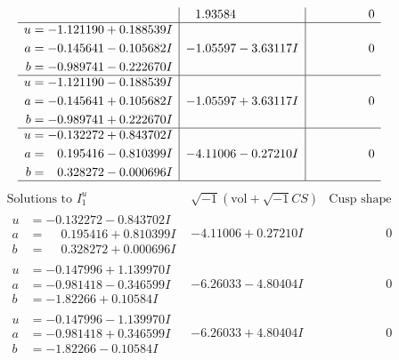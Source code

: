 \documentclass[1p]{elsarticle_modified}
\theoremstyle{definition}
\newcommand{\I}{\sqrt{-1}}
\begin{document}
$$\begin{array}{c|c|c}
 & \phantom{-}1.93584\phantom{ +0.000000I} & \phantom{-0.000000 } 0 \\ \hline\begin{aligned}
u &= -1.121190 + 0.188539 I \\
a &= -0.145641 - 0.105682 I \\
b &= -0.989741 - 0.222670 I\end{aligned}
 & -1.05597 - 3.63117 I & \phantom{-0.000000 } 0 \\ \hline\begin{aligned}
u &= -1.121190 - 0.188539 I \\
a &= -0.145641 + 0.105682 I \\
b &= -0.989741 + 0.222670 I\end{aligned}
 & -1.05597 + 3.63117 I & \phantom{-0.000000 } 0 \\ \hline\begin{aligned}
u &= -0.132272 + 0.843702 I \\
a &= \phantom{-}0.195416 - 0.810399 I \\
b &= \phantom{-}0.328272 - 0.000696 I\end{aligned}
 & -4.11006 - 0.27210 I & \phantom{-0.000000 } 0\\
 \hline 
 \end{array}$$\newpage$$\begin{array}{c|c|c}  
\text{Solutions to }I^u_{1}& \I (\text{vol} + \sqrt{-1}CS) & \text{Cusp shape}\\
 \hline 
\begin{aligned}
u &= -0.132272 - 0.843702 I \\
a &= \phantom{-}0.195416 + 0.810399 I \\
b &= \phantom{-}0.328272 + 0.000696 I\end{aligned}
 & -4.11006 + 0.27210 I & \phantom{-0.000000 } 0 \\ \hline\begin{aligned}
u &= -0.147996 + 1.139970 I \\
a &= -0.981418 - 0.346599 I \\
b &= -1.82266 + 0.10584 I\end{aligned}
 & -6.26033 - 4.80404 I & \phantom{-0.000000 } 0 \\ \hline\begin{aligned}
u &= -0.147996 - 1.139970 I \\
a &= -0.981418 + 0.346599 I \\
b &= -1.82266 - 0.10584 I\end{aligned}
 & -6.26033 + 4.80404 I & \phantom{-0.000000 } 0 \\ \hline\begin{aligned}

\end{aligned}
\end{array}$$
\end{document}

